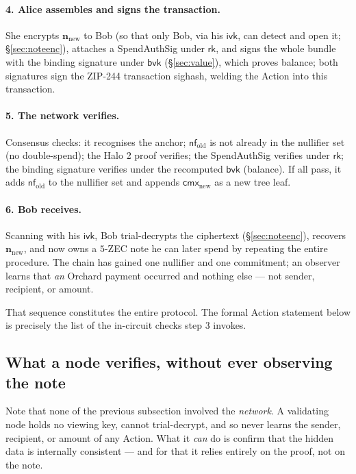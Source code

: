 \documentclass[11pt,a4paper]{article}
\theoremstyle{definition}
\newcommand{\nfsym}{\mathsf{nf}}
\newcommand{\cmx}{\mathsf{cmx}}
\newcommand{\rk}{\mathsf{rk}}
\newcommand{\ivk}{\ensuremath{\mathsf{ivk}}}
\begin{document}
\paragraph{4. Alice assembles and signs the transaction.} She encrypts
$\mathbf{n}_{\mathrm{new}}$ to Bob (so that only Bob, via his $\ivk$, can detect
and open it; \S\ref{sec:noteenc}), attaches a SpendAuthSig under $\rk$, and signs the whole
bundle with the binding signature under $\mathsf{bvk}$ (\S\ref{sec:value}),
which proves balance; both signatures sign the ZIP-244 transaction sighash,
welding the Action into this transaction.

\paragraph{5. The network verifies.} Consensus checks: it recognises the anchor;
$\nfsym_{\mathrm{old}}$ is not already in the nullifier set
(no double-spend); the Halo 2 proof verifies; the SpendAuthSig verifies
under $\rk$; the binding signature verifies under the recomputed
$\mathsf{bvk}$ (balance). If all pass, it adds $\nfsym_{\mathrm{old}}$ to the
nullifier set and appends $\cmx_{\mathrm{new}}$ as a new tree leaf.

\paragraph{6. Bob receives.} Scanning with his $\ivk$, Bob trial-decrypts
the ciphertext (\S\ref{sec:noteenc}), recovers $\mathbf{n}_{\mathrm{new}}$, and now owns a $5$-ZEC
note he can later spend by repeating the entire procedure. The chain has gained
one nullifier and one commitment; an observer learns that \emph{an} Orchard
payment occurred and nothing else --- not sender, recipient, or amount.

That sequence constitutes the entire protocol. The formal Action statement below
is precisely the list of the in-circuit checks step 3 invokes.

\subsection{What a node verifies, without ever observing the note}\label{sec:netverify}

Note that none of the previous subsection involved the \emph{network}. A
validating node holds no viewing key, cannot trial-decrypt, and so never learns
the sender, recipient, or amount of any Action. What it \emph{can} do is confirm
that the hidden data is internally consistent --- and for that it relies entirely
on the proof, not on the note.
\end{document}
